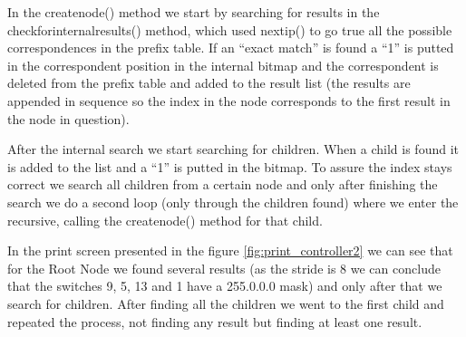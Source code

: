 \documentclass[]{report}
\begin{document}
In the create\textunderscore node() method we start by searching for results in the check\textunderscore for\textunderscore internal\textunderscore results() method, which used next\textunderscore ip() to go true all the possible correspondences in the prefix table. If an “exact match” is found a “1” is putted in the correspondent position in the internal bitmap and the correspondent is deleted from the prefix table and added to the result list (the results are appended in sequence so the index in the node corresponds to the first result in the node in question).

After the internal search we start searching for children. When a child is found it is added to the list and a “1” is putted in the bitmap. To assure the index stays correct we search all children from a certain node and only after finishing the search we do a second loop (only through the children found) where we enter the recursive, calling the create\textunderscore node() method for that child.

In the print screen presented in the figure \ref{fig:print_controller2} we can see that for the Root Node we found several results (as the stride is 8 we can conclude that the switches 9, 5, 13 and 1 have a 255.0.0.0 mask) and only after that we search for children. After finding all the children we went to the first child and repeated the process, not finding any result but finding at least one result.



\begin{minipage}{\linewidth}%

\label{fig:print_controller2}
\end{minipage}
\end{document}
